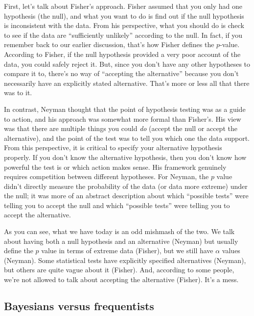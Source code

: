 \documentclass[
]{book}
\theoremstyle{definition}
\theoremstyle{definition}
\theoremstyle{definition}
\theoremstyle{definition}
\theoremstyle{remark}
\begin{document}
First, let's talk about Fisher's approach. Fisher assumed that you only had one hypothesis (the null), and what you want to do is find out if the null hypothesis is inconsistent with the data. From his perspective, what you should do is check to see if the data are ``sufficiently unlikely'' according to the null. In fact, if you remember back to our earlier discussion, that's how Fisher defines the \(p\)-value. According to Fisher, if the null hypothesis provided a very poor account of the data, you could safely reject it. But, since you don't have any other hypotheses to compare it to, there's no way of ``accepting the alternative'' because you don't necessarily have an explicitly stated alternative. That's more or less all that there was to it.

In contrast, Neyman thought that the point of hypothesis testing was as a guide to action, and his approach was somewhat more formal than Fisher's. His view was that there are multiple things you could \emph{do} (accept the null or accept the alternative), and the point of the test was to tell you which one the data support. From this perspective, it is critical to specify your alternative hypothesis properly. If you don't know the alternative hypothesis, then you don't know how powerful the test is or which action makes sense. His framework genuinely requires competition between different hypotheses. For Neyman, the \(p\) value didn't directly measure the probability of the data (or data more extreme) under the null; it was more of an abstract description about which ``possible tests'' were telling you to accept the null and which ``possible tests'' were telling you to accept the alternative.

As you can see, what we have today is an odd mishmash of the two. We talk about having both a null hypothesis and an alternative (Neyman) but usually define the \(p\) value in terms of extreme data (Fisher), but we still have \(\alpha\) values (Neyman). Some statistical tests have explicitly specified alternatives (Neyman), but others are quite vague about it (Fisher). And, according to some people, we're not allowed to talk about accepting the alternative (Fisher). It's a mess.

\hypertarget{bayesians-versus-frequentists}{%
\subsection{Bayesians versus frequentists}\label{bayesians-versus-frequentists}}
\end{document}
